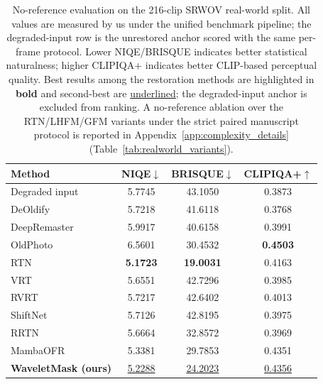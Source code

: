 {\begin{table}[H]
\caption{No-reference evaluation on the 216-clip SRWOV real-world split. All values are measured by us under the unified benchmark pipeline; the degraded-input row is the unrestored anchor scored with the same per-frame protocol. Lower NIQE/BRISQUE indicates better statistical naturalness; higher CLIPIQA+ indicates better CLIP-based perceptual quality. Best results among the restoration methods are highlighted in \textbf{bold} and second-best are \underline{underlined}; the degraded-input anchor is excluded from ranking. A no-reference ablation over the RTN/LHFM/GFM variants under the strict paired manuscript protocol is reported in Appendix~\ref{app:complexity_details} (Table~\ref{tab:realworld_variants}).\label{tab:realworld_literature}}
\footnotesize
\begin{tabularx}{\textwidth}{lCCC}
\toprule
\textbf{Method} & \textbf{NIQE$\downarrow$} & \textbf{BRISQUE$\downarrow$} & \textbf{CLIPIQA+$\uparrow$} \\
\midrule
Degraded input                              & 5.7745 & 43.1050 & 0.3873 \\
DeOldify~\cite{jantic2019deoldify}          & 5.7218 & 41.6118 & 0.3768 \\
DeepRemaster~\cite{iizuka2019deepremaster}  & 5.9917 & 40.6158 & 0.3991 \\
OldPhoto~\cite{wan2020bringing}             & 6.5601 & 30.4532 & \textbf{0.4503} \\
RTN~\cite{rtn2022}                          & \textbf{5.1723} & \textbf{19.0031} & 0.4163 \\
VRT~\cite{liang2024vrt}                     & 5.6551 & 42.7296 & 0.3985 \\
RVRT~\cite{liang2022rvrt}                   & 5.7217 & 42.6402 & 0.4013 \\
ShiftNet~\cite{li2023shiftnet}              & 5.7126 & 42.8195 & 0.3975 \\
RRTN~\cite{rrtn2024}                        & 5.6664 & 32.8572 & 0.3969 \\
MambaOFR~\cite{mao2025mambaofr}             & 5.3381 & 29.7853 & 0.4351 \\
\midrule
\textbf{WaveletMask (ours)}                 & \underline{5.2288} & \underline{24.2023} & \underline{0.4356} \\
\bottomrule
\end{tabularx}
\normalsize
\end{table}

}
